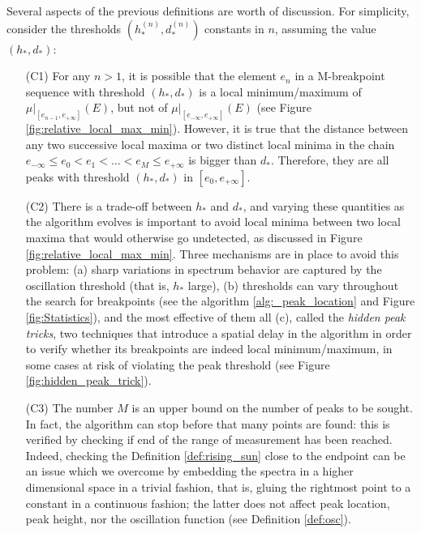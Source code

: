 \documentclass[%
 reprint,
 amsmath,amssymb,
 aps,
]{revtex4-1}
\begin{document}
Several aspects of the previous definitions are worth of discussion. For simplicity, consider the thresholds  $(h_*^{(n)},d_*^{(n)})$ constants in $n$, assuming the value $(h_*,d_*)$:
\begin{enumerate}[label=\textnormal{(\arabic*)}]%
\item[(C1)] \label{C1}  For any $n>1$, it is possible that the element $e_n$ in a M-breakpoint sequence with threshold $(h_*,d_*)$ is a local minimum/maximum  of $\mu\Big\vert_{[e_{n-1},e_{+\infty}]}(E)$, but not of $\mu\Big\vert_{[e_{-\infty},e_{+\infty}]}(E)$ (see Figure \ref{fig:relative_local_max_min}). However, it is true that the distance between any two successive local maxima or two distinct local minima in the chain $e_{-\infty}\leq e_0< e_1 <\ldots <e_M \leq e_{+\infty}$ is bigger than $d_*$. Therefore, they are all peaks with threshold  $(h_*,d_*)$ in $[e_0, e_{+\infty}]$. 

\item[(C2)] \label{C2} There is a trade-off between $h_*$ and $d_*$, and varying these quantities as the algorithm evolves is important to avoid local minima between two local maxima that would otherwise go undetected, as discussed in Figure \ref{fig:relative_local_max_min}. Three mechanisms are in place to avoid this problem: (a)  sharp variations in spectrum behavior are captured by the oscillation threshold (that is, $h_*$ large), (b) thresholds can vary throughout the search for breakpoints (see the  algorithm \ref{alg:_peak_location} and Figure \ref{fig:Statistics}), and the most effective of them all (c), called  the \textit{hidden peak tricks}, two techniques that introduce a spatial delay in the algorithm in order to verify whether its breakpoints are indeed local minimum/maximum, in some cases at risk of violating the peak threshold (see Figure \ref{fig:hidden_peak_trick}).
\item[(C3)] \label{C3}The number $M$ is an upper bound on the number of peaks to be sought. In fact, the algorithm can stop before that many points are found: this is verified by checking if end of the range of measurement has been reached. Indeed, checking the Definition \ref{def:rising_sun} close to the endpoint can be an issue which we overcome by embedding the spectra in a higher dimensional space in a trivial fashion, that is, gluing the rightmost point to a constant in a continuous fashion; the latter does not affect peak location, peak height, nor the oscillation function (see Definition \ref{def:osc}). 

\end{enumerate}
\end{document}
